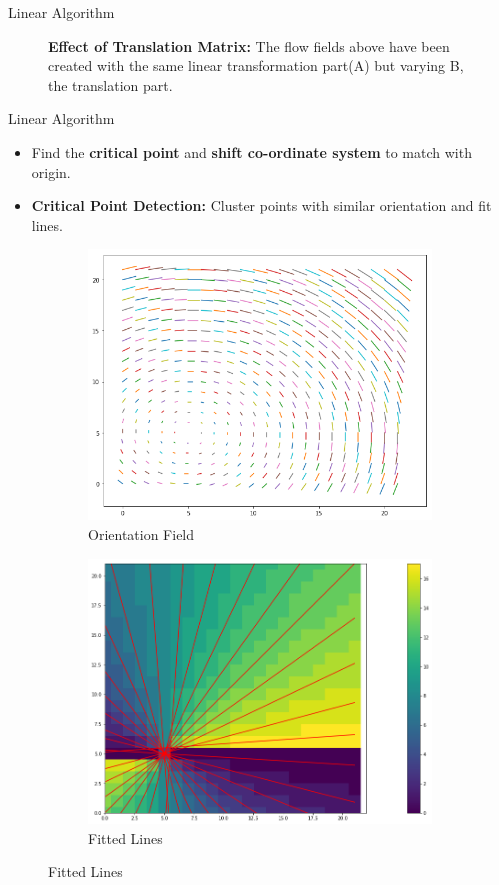 \documentclass{beamer}
\begin{document}
\begin{frame}{Linear Algorithm}
\begin{itemize}
\begin{figure}[h]
\begin{subfigure}[b]{0.4\textwidth}
\begin{minipage}{.5\textwidth}
		\end{minipage}
	\end{subfigure}
	
	
	
	\caption{\textbf{Effect of Translation Matrix:} The flow fields above have been created with the same linear transformation part(A) but varying B, the translation part. }\label{crit_adjust} 
	
\end{figure}        

\end{itemize}

\end{frame}

\begin{frame}{Linear Algorithm}
\begin{itemize}
\item Find the \textbf{critical point} and \textbf{shift co-ordinate system} to match with origin.
\item \textbf{Critical Point Detection:} Cluster points with similar orientation and fit lines.

\end{itemize}
 \begin{figure}[h]
 \centering
       	\begin{subfigure}[t]{.3\textwidth}
       	\centering
       		\includegraphics[width=0.6\linewidth]{images/cluster_2.png}
       		\caption{Orientation Field}
       	\end{subfigure}\hfill%
       	\begin{subfigure}[t]{.3\textwidth}
       	\centering
       		\includegraphics[width=0.6\linewidth]{images/line_clr2.png}
       		\caption{Fitted Lines}
       		

\end{subfigure}
\end{figure}
\end{frame}
\end{document}
